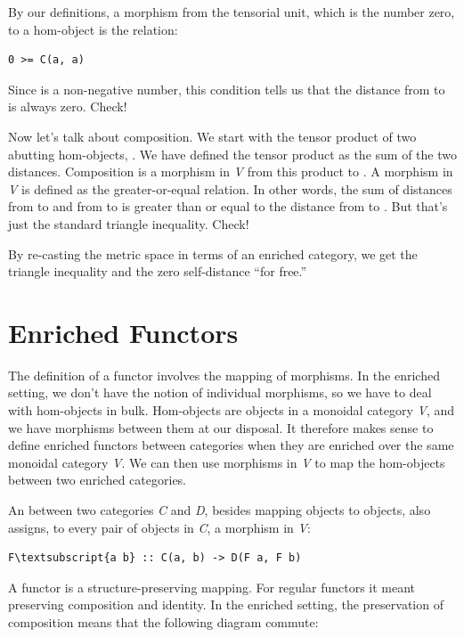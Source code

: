 By our definitions, a morphism from the tensorial unit, which is the
number zero, to a hom-object  is the relation:

\begin{Verbatim}[commandchars=\\\{\}]
0 >= C(a, a)
\end{Verbatim}
Since  is a non-negative number, this condition tells
us that the distance from  to  is always zero.
Check!

Now let's talk about composition. We start with the tensor product of
two abutting hom-objects, . We have defined
the tensor product as the sum of the two distances. Composition is a
morphism in \emph{V} from this product to . A morphism
in \emph{V} is defined as the greater-or-equal relation. In other words,
the sum of distances from  to  and from 
to  is greater than or equal to the distance from 
to . But that's just the standard triangle inequality. Check!

By re-casting the metric space in terms of an enriched category, we get
the triangle inequality and the zero self-distance ``for free.''

\section{Enriched Functors}\label{enriched-functors}

The definition of a functor involves the mapping of morphisms. In the
enriched setting, we don't have the notion of individual morphisms, so
we have to deal with hom-objects in bulk. Hom-objects are objects in a
monoidal category \emph{V}, and we have morphisms between them at our
disposal. It therefore makes sense to define enriched functors between
categories when they are enriched over the same monoidal category
\emph{V}. We can then use morphisms in \emph{V} to map the hom-objects
between two enriched categories.

An   between two categories \emph{C}
and \emph{D}, besides mapping objects to objects, also assigns, to every
pair of objects in \emph{C}, a morphism in \emph{V}:

\begin{Verbatim}[commandchars=\\\{\}]
F\textsubscript{a b} :: C(a, b) -> D(F a, F b)
\end{Verbatim}
A functor is a structure-preserving mapping. For regular functors it
meant preserving composition and identity. In the enriched setting, the
preservation of composition means that the following diagram commute:

